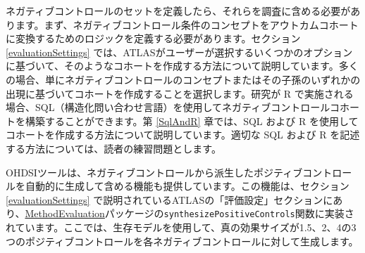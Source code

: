 \documentclass[
  11pt]{book}
\theoremstyle{definition}
\theoremstyle{definition}
\theoremstyle{definition}
\theoremstyle{definition}
\theoremstyle{remark}
\begin{document}
ネガティブコントロールのセットを定義したら、それらを調査に含める必要があります。まず、ネガティブコントロール条件のコンセプトをアウトカムコホートに変換するためのロジックを定義する必要があります。セクション \ref{evaluationSettings} では、ATLASがユーザーが選択するいくつかのオプションに基づいて、そのようなコホートを作成する方法について説明しています。多くの場合、単にネガティブコントロールのコンセプトまたはその子孫のいずれかの出現に基づいてコホートを作成することを選択します。研究が R で実施される場合、SQL（構造化問い合わせ言語）を使用してネガティブコントロールコホートを構築することができます。第 \ref{SqlAndR} 章では、SQL および R を使用してコホートを作成する方法について説明しています。適切な SQL および R を記述する方法については、読者の練習問題とします。

OHDSIツールは、ネガティブコントロールから派生したポジティブコントロールを自動的に生成して含める機能も提供しています。この機能は、セクション \ref{evaluationSettings} で説明されているATLASの「評価設定」セクションにあり、\href{https://ohdsi.github.io/MethodEvaluation/}{MethodEvaluation}パッケージの\texttt{synthesizePositiveControls}関数に実装されています。ここでは、生存モデルを使用して、真の効果サイズが1.5、2、4の3つのポジティブコントロールを各ネガティブコントロールに対して生成します。
\end{document}
